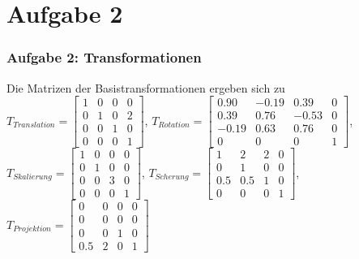 \documentclass[accentcolor=tud9c,colorbacktitle,inverttitle,landscape,german,presentation,t]{tudbeamer}
\begin{document}
	\section{Aufgabe 2}
	\begin{frame}
		\frametitle{Aufgabe 2: Transformationen}
		Die Matrizen der Basistransformationen ergeben sich zu
		$T_{Translation}=\begin{bmatrix}
		1 & 0 & 0 & 0\\
		0 & 1 & 0 & 2\\
		0 & 0 & 1 & 0\\
		0 & 0 & 0 & 1
		\end{bmatrix} $, 
		$T_{Rotation}=\begin{bmatrix}
		0.90 & -0.19 & 0.39 & 0\\
		0.39 & 0.76 & -0.53 & 0\\
		-0.19 & 0.63 & 0.76 & 0\\
		0 & 0 & 0 & 1
		\end{bmatrix} $, 
		$T_{Skalierung}=\begin{bmatrix}
		1 & 0 & 0 & 0\\
		0 & 1 & 0 & 0\\
		0 & 0 & 3 & 0\\
		0 & 0 & 0 & 1
		\end{bmatrix} $, 
		$T_{Scherung}=\begin{bmatrix}
		1 & 2 & 2 & 0\\
		0 & 1 & 0 & 0\\
		0.5 & 0.5 & 1 & 0\\
		0 & 0 & 0 & 1
		\end{bmatrix} $,
		$T_{Projektion}=\begin{bmatrix}
		0 & 0 & 0 & 0\\
		0 & 0 & 0 & 0\\
		0 & 0 & 1 & 0\\
		0.5 & 2 & 0 & 1
		\end{bmatrix} $\\
		
	\end{frame}
\end{document}
